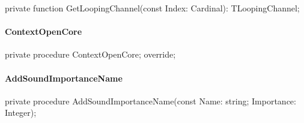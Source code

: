 \documentclass{report}
\begin{document}
\begin{list}{}{
\setlength{\itemindent}{0cm}
\setlength{\listparindent}{0cm}
\setlength{\leftmargin}{\evensidemargin}
\addtolength{\leftmargin}{\tmplength}
\settowidth{\labelsep}{X}
\addtolength{\leftmargin}{\labelsep}
\setlength{\labelwidth}{\tmplength}
}
\begin{flushleft}
\item[\textbf{Declaration}\hfill]
\begin{ttfamily}
private function GetLoopingChannel(const Index: Cardinal): TLoopingChannel;\end{ttfamily}


\end{flushleft}
\end{list}
\paragraph*{ContextOpenCore}\hspace*{\fill}

\begin{list}{}{
\setlength{\itemindent}{0cm}
\setlength{\listparindent}{0cm}
\setlength{\leftmargin}{\evensidemargin}
\addtolength{\leftmargin}{\tmplength}
\settowidth{\labelsep}{X}
\addtolength{\leftmargin}{\labelsep}
\setlength{\labelwidth}{\tmplength}
}
\begin{flushleft}
\item[\textbf{Declaration}\hfill]
\begin{ttfamily}
private procedure ContextOpenCore; override;\end{ttfamily}


\end{flushleft}
\end{list}
\paragraph*{AddSoundImportanceName}\hspace*{\fill}

\begin{list}{}{
\setlength{\itemindent}{0cm}
\setlength{\listparindent}{0cm}
\setlength{\leftmargin}{\evensidemargin}
\addtolength{\leftmargin}{\tmplength}
\settowidth{\labelsep}{X}
\addtolength{\leftmargin}{\labelsep}
\setlength{\labelwidth}{\tmplength}
}
\begin{flushleft}
\item[\textbf{Declaration}\hfill]
\begin{ttfamily}
private procedure AddSoundImportanceName(const Name: string; Importance: Integer);\end{ttfamily}


\end{flushleft}
\end{list}
\end{document}
